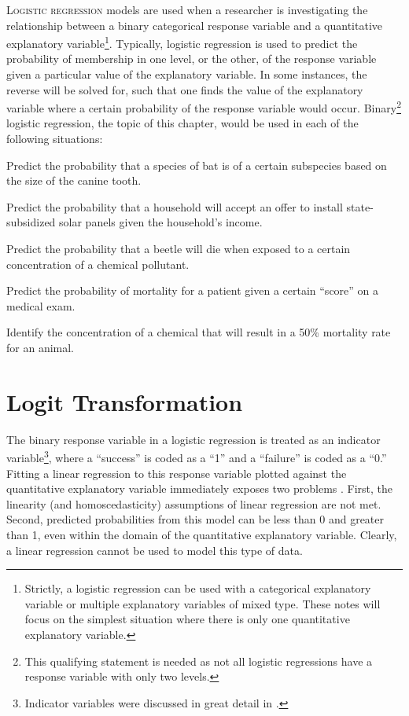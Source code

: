 \documentclass[10pt,openany]{book}\usepackage[]{graphicx}\usepackage[]{color}
\begin{document}
\lettrine{L}{ogistic regression} models are used when a researcher is investigating the relationship between a binary categorical response variable and a quantitative explanatory variable\footnote{Strictly, a logistic regression can be used with a categorical explanatory variable or multiple explanatory variables of mixed type.  These notes will focus on the simplest situation where there is only one quantitative explanatory variable.}.  Typically, logistic regression is used to predict the probability of membership in one level, or the other, of the response variable given a particular value of the explanatory variable.  In some instances, the reverse will be solved for, such that one finds the value of the explanatory variable where a certain probability of the response variable would occur.  Binary\footnote{This qualifying statement is needed as not all logistic regressions have a response variable with only two levels.} logistic regression, the topic of this chapter, would be used in each of the following situations:
\begin{Enumerate}
  \item Predict the probability that a species of bat is of a certain subspecies based on the size of the canine tooth.
  \item Predict the probability that a household will accept an offer to install state-subsidized solar panels given the household's income.
  \item Predict the probability that a beetle will die when exposed to a certain concentration of a chemical pollutant.
  \item Predict the probability of mortality for a patient given a certain ``score'' on a medical exam.
  \item Identify the concentration of a chemical that will result in a 50\% mortality rate for an animal.
\end{Enumerate}


\section{Logit Transformation}


The binary response variable in a logistic regression is treated as an indicator variable\footnote{Indicator variables were discussed in great detail in .}, where a ``success'' is coded as a ``1'' and a ``failure'' is coded as a ``0.''  Fitting a linear regression to this response variable plotted against the quantitative explanatory variable immediately exposes two problems .  First, the linearity (and homoscedasticity) assumptions of linear regression are not met.  Second, predicted probabilities from this model can be less than 0 and greater than 1, even within the domain of the quantitative explanatory variable.  Clearly, a linear regression cannot be used to model this type of data.
\end{document}
